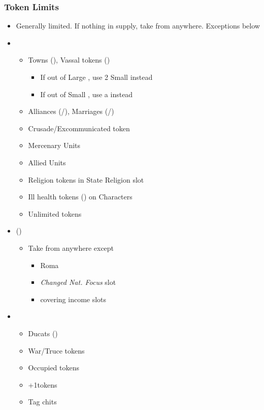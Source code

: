 \documentclass[10pt]{article}
\begin{document}
\subsubsection*{Token Limits}
\begin{itemize}
	\item Generally limited. If nothing in supply, take from anywhere. Exceptions below
	\item {}
	\begin{itemize}
		\item Towns (\town), Vassal tokens (\vassal)
		\begin{itemize}
			\item If out of Large \towns, use 2 Small \towns instead
			\item If out of Small \towns, use a \vassal instead
		\end{itemize}
		\item Alliances (\alliance/\activeally), Marriages (\marriage/\disputedsuccession)
		\item Crusade/Excommunicated token
		\item Mercenary Units
		\item Allied Units
		\item Religion tokens in State Religion slot
		\item Ill health tokens (\illhealth) on Characters
		\item \dprime Unlimited\dprime\xspace tokens
	\end{itemize}
	\item {} (\cube)
	\begin{itemize}
		\item Take from anywhere except
		\begin{itemize}
			\item Roma \cardinal
			\item \emph{Changed Nat. Focus} slot
			\item \cubes covering income slots
		\end{itemize}
	\end{itemize}
	\item {}
	\begin{itemize}
		\item Ducats (\ducats)
		\item War/Truce tokens
		\item Occupied tokens
		\item +1\manpower tokens
		\item Tag chits
	\end{itemize}
\end{itemize}
\end{document}
